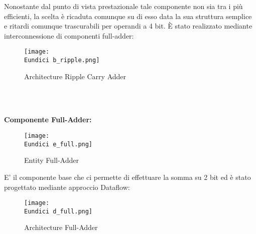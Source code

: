 \documentclass[12pt]{article}
\def \Eundici{Allegati/Esercizio11/}
\begin{document}
\clearpage
Nonostante dal punto di vista prestazionale tale componente non sia tra i più efficienti, la scelta è ricaduta comunque su di esso data la sua struttura semplice e ritardi comunque trascurabili per operandi a 4 bit. È stato realizzato mediante interconnessione di componenti full-adder:
\begin{figure}[ht!]
    \centering
    \texttt{[image: \\Eundici b\_ripple.png]}
    \caption{Architecture Ripple Carry Adder}
\end{figure}
\\\\{\large \textbf{Componente Full-Adder:}
\begin{figure}[ht!]
    \centering
    \texttt{[image: \\Eundici e\_full.png]}
    \caption{Entity Full-Adder}
\end{figure}
\clearpage
E' il componente base che ci permette di effettuare la somma su 2 bit ed è stato progettato mediante approccio Dataflow:
\begin{figure}[ht!]
    \centering
    \texttt{[image: \\Eundici d\_full.png]}
    \caption{Architecture Full-Adder}
\end{figure}
}
\end{document}
